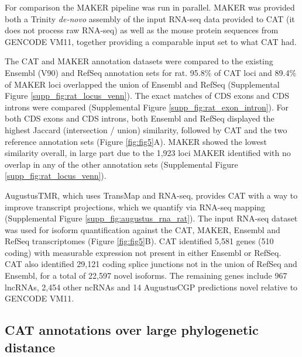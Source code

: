 \documentclass[fleqn,10pt]{wlscirep}
\begin{document}
For comparison the MAKER pipeline \cite{cantarel2008maker} was run in parallel. MAKER was provided both a Trinity \cite{haas2013novo} \textit{de-novo} assembly of the input RNA-seq data provided to CAT (it does not process raw RNA-seq) as well as the mouse protein sequences from GENCODE VM11, together providing a comparable input set to what CAT had. 

The CAT and MAKER annotation datasets were compared to the existing Ensembl (V90) and RefSeq annotation sets for rat. 95.8\% of CAT loci and 89.4\% of MAKER loci overlapped the union of Ensembl and RefSeq (Supplemental Figure \ref{supp_fig:rat_locus_venn}). The exact matches of CDS exons and CDS introns were compared (Supplemental Figure \ref{supp_fig:rat_exon_intron}). For both CDS exons and CDS introns, both Ensembl and RefSeq displayed the highest Jaccard (intersection / union) similarity, followed by CAT and the two reference annotation sets (Figure \ref{fig:fig5}A). MAKER showed the lowest similarity overall, in large part due to the 1,923 loci MAKER identified with no overlap in any of the other annotation sets (Supplemental Figure \ref{supp_fig:rat_locus_venn}). 

AugustusTMR, which uses TransMap and RNA-seq, provides CAT with a way to improve transcript projections, which we quantify via RNA-seq mapping (Supplemental Figure \ref{supp_fig:augustus_rna_rat}). The input RNA-seq dataset was used for isoform quantification against the CAT, MAKER, Ensembl and RefSeq transcriptomes (Figure \ref{fig:fig5}B). CAT identified 5,581 genes (510 coding) with measurable expression not present in either Ensembl or RefSeq. CAT also identified 29,121 coding splice junctions not in the union of RefSeq and Ensembl, for a total of 22,597 novel isoforms. The remaining genes include 967 lncRNAs, 2,454 other ncRNAs and 14 AugustusCGP predictions novel relative to GENCODE VM11.


\subsection*{CAT annotations over large phylogenetic distance}
\end{document}
